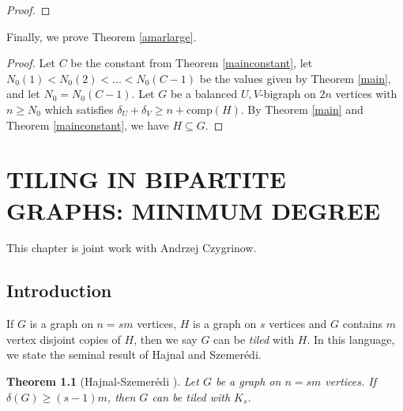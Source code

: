 \documentclass[oneside,12pt]{memoir}
\newtheorem{theorem}{Theorem}[section]
\begin{document}
\begin{proof}

\end{proof}

Finally, we prove Theorem \ref{amarlarge}.

\begin{proof}
Let $C$ be the constant from Theorem \ref{mainconstant}, let $N_0(1)<N_0(2)<\dots<N_0(C-1)$ be the values given by Theorem \ref{main}, and let $N_0=N_0(C-1)$. Let $G$ be a balanced $U,V$-bigraph on $2n$ vertices with $n\geq N_0$ which satisfies $\delta_U+\delta_V\geq n+\mathrm{comp}(H)$.  By Theorem \ref{main} and Theorem \ref{mainconstant}, we have $H\subseteq G$.
\end{proof}





\chapter{TILING IN BIPARTITE GRAPHS: MINIMUM DEGREE}\label{mindegtilingchapter}

\DoubleSpacing
\setlength{\parindent}{.5in}

This chapter is joint work with Andrzej Czygrinow. 

\section{Introduction}

If $G$ is a graph on $n=sm$ vertices, $H$ is a graph on $s$ vertices and $G$ contains $m$ vertex disjoint copies of $H$, then we say $G$ can be \emph{tiled} with $H$.  In this language, we state the seminal result of Hajnal and Szemer\'edi.

\begin{theorem}[Hajnal-Szemer\'edi \cite{HSz}]
Let $G$ be a graph on $n=sm$ vertices.  If $\delta(G)\geq (s-1)m$, then $G$ can be tiled with $K_s$.
\end{theorem}
\end{document}
